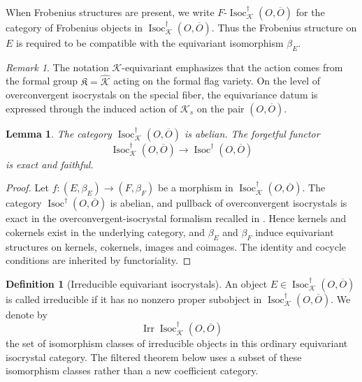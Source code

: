 \documentclass[11pt]{amsart}
\theoremstyle{plain}
\newtheorem{lemma}{Lemma}[section]
\theoremstyle{definition}
\newtheorem{definition}{Definition}[section]
\theoremstyle{remark}
\newtheorem{remark}{Remark}[section]
\newcommand{\Irr}{\operatorname{Irr}}
\newcommand{\Isoc}{\operatorname{Isoc}}
\begin{document}
When Frobenius structures are present, we write
\(F\text{-}\Isoc^{\dagger}_{\mathcal K}(O,\overline O)\) for the category of
Frobenius objects in \(\Isoc^{\dagger}_{\mathcal K}(O,\overline O)\).  Thus the
Frobenius structure on \(E\) is required to be compatible with the equivariant
isomorphism \(\beta_E\).

\begin{remark}
\label{rem:K-versus-Ks-isocrystals}
The notation \(\mathcal K\)-equivariant emphasizes that the action comes from
the formal group \(\mathfrak K=\widehat{\mathcal K}\) acting on the formal flag
variety. On the level of overconvergent isocrystals on the special fiber, the
equivariance datum is expressed through the induced action of \(\mathcal K_s\)
on the pair \((O,\overline O)\).
\end{remark}

\begin{lemma}
\label{lem:isoc-equivariant-abelian}
The category \(\Isoc^{\dagger}_{\mathcal K}(O,\overline O)\) is abelian. The
forgetful functor
\[
  \Isoc^{\dagger}_{\mathcal K}(O,\overline O)
  \longrightarrow
  \Isoc^{\dagger}(O,\overline O)
\]
is exact and faithful.
\end{lemma}

\begin{proof}
Let \(f:(E,\beta_E)\to(F,\beta_F)\) be a morphism in
\(\Isoc^{\dagger}_{\mathcal K}(O,\overline O)\). The category
\(\Isoc^{\dagger}(O,\overline O)\) is abelian, and pullback of overconvergent
isocrystals is exact in the overconvergent-isocrystal formalism recalled in
.  Hence kernels and cokernels exist in
the underlying category, and \(\beta_E\) and \(\beta_F\) induce equivariant
structures on kernels, cokernels, images and coimages. The identity and cocycle conditions are inherited by
functoriality.
\end{proof}

\begin{definition}[Irreducible equivariant isocrystals]
\label{def:irreducible-equivariant-isocrystal}
An object \(E\in \Isoc^{\dagger}_{\mathcal K}(O,\overline O)\) is called
irreducible if it has no nonzero proper subobject in
\(\Isoc^{\dagger}_{\mathcal K}(O,\overline O)\). We denote by
\[
  \Irr\Isoc^{\dagger}_{\mathcal K}(O,\overline O)
\]
the set of isomorphism classes of irreducible objects in this ordinary
equivariant isocrystal category.  The filtered theorem below uses a subset of
these isomorphism classes rather than a new coefficient category.
\end{definition}
\end{document}
